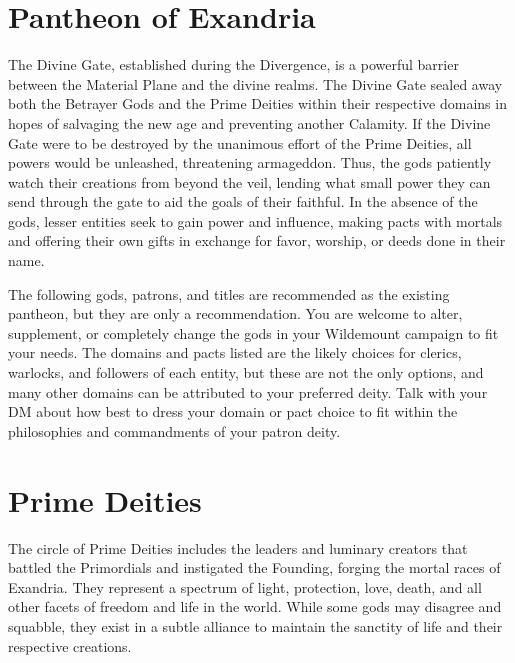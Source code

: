 \documentclass[10pt,a4paper,twoside,bg=print,twocolumn,openany,nodeprecatedcode]{dndbook}
\begin{document}
\section{Pantheon of Exandria}
The Divine Gate, established during the Divergence, is a powerful barrier between the Material Plane and the divine realms. The Divine Gate sealed away both the Betrayer Gods and the Prime Deities within their respective domains in hopes of salvaging the new age and preventing another Calamity. If the Divine Gate were to be destroyed by the unanimous effort of the Prime Deities, all powers would be unleashed, threatening armageddon. Thus, the gods patiently watch their creations from beyond the veil, lending what small power they can send through the gate to aid the goals of their faithful. In the absence of the gods, lesser entities seek to gain power and influence, making pacts with mortals and offering their own gifts in exchange for favor, worship, or deeds done in their name.

The following gods, patrons, and titles are recommended as the existing pantheon, but they are only a recommendation. You are welcome to alter, supplement, or completely change the gods in your Wildemount campaign to fit your needs. The domains and pacts listed are the likely choices for clerics, warlocks, and followers of each entity, but these are not the only options, and many other domains can be attributed to your preferred deity. Talk with your DM about how best to dress your domain or pact choice to fit within the philosophies and commandments of your patron deity.

\section{Prime Deities}
The circle of Prime Deities includes the leaders and luminary creators that battled the Primordials and instigated the Founding, forging the mortal races of Exandria. They represent a spectrum of light, protection, love, death, and all other facets of freedom and life in the world. While some gods may disagree and squabble, they exist in a subtle alliance to maintain the sanctity of life and their respective creations.
\end{document}

